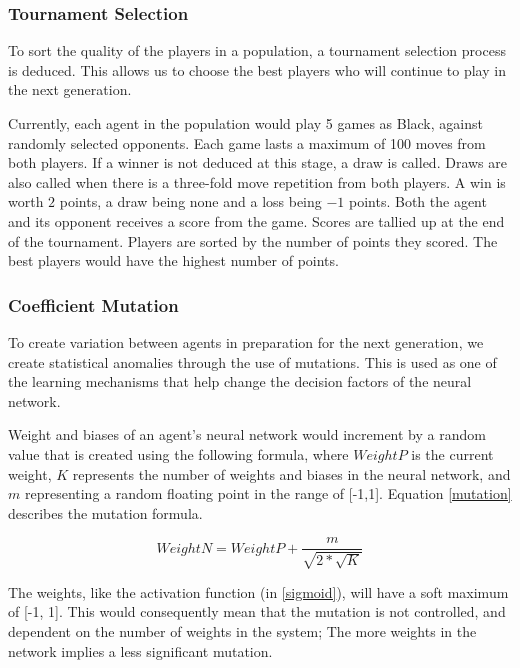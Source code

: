 \documentclass[12pt,a4paper]{article}
\begin{document}
\subsubsection{Tournament Selection} \label{tournament_selection}

    To sort the quality of the players in a population, a tournament selection process is deduced. This allows us to choose the best players who will continue to play in the next generation.

    Currently, each agent in the population would play 5 games as Black, against randomly selected opponents. Each game lasts a maximum of 100 moves from both players. If a winner is not deduced at this stage, a draw is called. Draws are also called when there is a three-fold move repetition from both players. A win is worth $2$ points, a draw being none and a loss being $-1$ points. Both the agent and its opponent receives a score from the game.
    Scores are tallied up at the end of the tournament. Players are sorted by the number of points they scored. The best players would have the highest number of points.
    
\subsubsection{Coefficient Mutation} \label{coefficient_mutation}

    To create variation between agents in preparation for the next generation, we create statistical anomalies through the use of mutations. This is used as one of the learning mechanisms that help change the decision factors of the neural network.

    Weight and biases of an agent's neural network would increment by a random value that is created using the following formula, where $WeightP$ is the current weight, $K$ represents the number of weights and biases in the neural network, and $m$ representing a random floating point in the range of [-1,1]. Equation \ref{mutation} describes the mutation formula.

    \begin{equation} \label{mutation}
         WeightN = WeightP + \frac{m}{\sqrt{2 * \sqrt{K} }}
    \end{equation}

    The weights, like the activation function (in \ref{sigmoid}), will have a soft maximum of [-1, 1]. This would consequently mean that the mutation is not controlled, and dependent on the number of weights in the system; The more weights in the network implies a less significant mutation.
\end{document}
